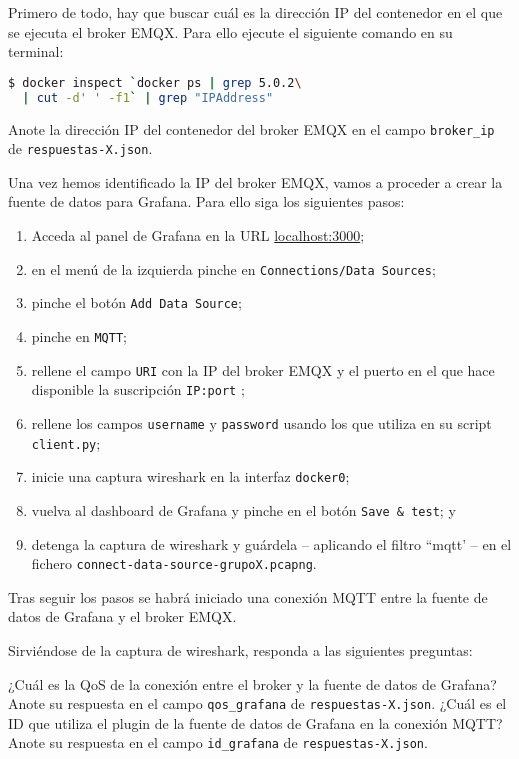 \documentclass{upmassignment}
\begin{document}
Primero de todo, hay que buscar cuál
es la dirección IP del contenedor en el que
se ejecuta el broker EMQX. Para ello
ejecute el siguiente comando en su terminal:
\begin{lstlisting}[language=bash]
$ docker inspect `docker ps | grep 5.0.2\
  | cut -d' ' -f1` | grep "IPAddress"
\end{lstlisting}

\begin{problemlist}
\setcounter{enumi}{1}
\pbitem Anote la dirección IP del contenedor
    del broker EMQX en el campo
    \texttt{broker\_ip} de
    \texttt{respuestas-X.json}.
\end{problemlist}


Una vez hemos identificado la IP
del broker EMQX, vamos a proceder a 
crear la fuente de datos para Grafana.
Para ello siga los siguientes pasos:
\begin{enumerate}
    \item Acceda al panel de
        Grafana en la URL
        \url{localhost:3000};
    \item en el menú de la izquierda pinche
        en \texttt{Connections/Data Sources};
    \item pinche el botón
        \texttt{Add Data Source};
    \item pinche en \texttt{MQTT};
    \item rellene el campo \texttt{URI}
        con la IP del broker EMQX y
        el puerto en el que hace
        disponible la suscripción
        \texttt{IP:port} ;
    \item rellene los campos
        \texttt{username} y
        \texttt{password} usando los que
        utiliza en su script
        \texttt{client.py};
    \item inicie una captura wireshark
        en la interfaz \texttt{docker0};
    \item vuelva al dashboard de Grafana
        y pinche en el botón
        \texttt{Save \& test}; y
    \item detenga la captura de wireshark
        y guárdela -- aplicando el
        filtro ``mqtt' -- en el
        fichero
        \texttt{connect-data-source-grupoX.pcapng}.
\end{enumerate}
Tras seguir los pasos se habrá iniciado
una conexión MQTT entre la fuente
de datos de Grafana y el broker EMQX.


Sirviéndose de la captura de wireshark,
responda a las siguientes preguntas:
\begin{problemlist}
\setcounter{enumi}{2}
    \pbitem ¿Cuál es la QoS de la conexión
        entre el broker y la fuente de
        datos de Grafana?
        Anote su respuesta en el campo
        \texttt{qos\_grafana}
        de \texttt{respuestas-X.json}.
    \pbitem ¿Cuál es el ID que utiliza
        el plugin de la fuente de datos 
        de Grafana en la conexión MQTT?
        Anote su respuesta en el campo
        \texttt{id\_grafana}
        de \texttt{respuestas-X.json}.
\end{problemlist}
\end{document}
